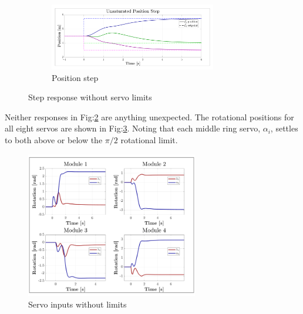 \newpage
\begin{figure}[htbp]
\vspace{-12pt}
\centering
\begin{subfigure}{\textwidth}
\centering
\includegraphics[width=0.8\textwidth]{graphs/unsaturated-position-step}
\vspace{-8pt}
\caption{Position step}
\label{fig:unsaturated-position-step}
\end{subfigure}
\vspace{-10pt}
\caption{Step response without servo limits}
\label{fig:unsaturated-step}
\vspace{-10pt}
\end{figure}
\par
Neither responses in Fig:\ref{fig:unsaturated-step} are anything unexpected. The rotational positions for all eight servos are shown in Fig:\ref{fig:unsaturated-servos}. Noting that each middle ring servo, $\alpha_i$, settles to both above or below the $\pi/2$ rotational limit.
\begin{figure}[hbtp]
\vspace{-12pt}
\centering
\includegraphics[width=0.67\textwidth]{graphs/unsaturated-servos}
\vspace{-12pt}
\caption{Servo inputs without limits}
\label{fig:unsaturated-servos}
\vspace{-20pt}
\end{figure}
